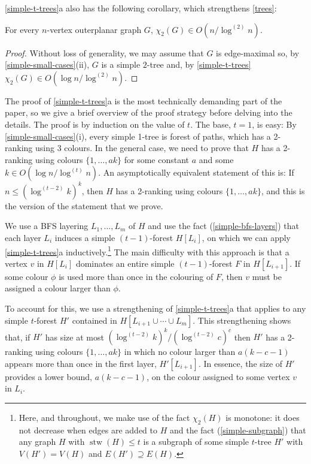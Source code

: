\documentclass[kpfonts]{patmorin}
\DeclareMathOperator{\stw}{stw}
\newcommand{\trn}{\chi_2}
\theoremstyle{named}
\newcommand{\weirdref}[2]{\cref{#1}#2}
\begin{document}
\weirdref{simple-t-trees}{a} also has the following corollary, which strengthens \cref{trees}:

\begin{cor}\label{outerplanar}
    For every $n$-vertex outerplanar graph $G$, $\trn(G)\in O(n/\log^{(2)} n)$.
\end{cor}

\begin{proof}
    Without loss of generality, we may assume that $G$ is edge-maximal so, by \cref{simple-small-cases}{(ii)}, $G$ is a simple $2$-tree and, by \cref{simple-t-trees} $\trn(G)\in O(\log n/\log^{(2)} n)$.
\end{proof}


The proof of \weirdref{simple-t-trees}{a} is the most technically demanding part of the paper, so we give a brief overview of the proof strategy before delving into the details.  The proof is by induction on the value of $t$.  The base, $t=1$, is easy: By \cref{simple-small-cases}(i), every simple 1-tree is forest of paths, which has a 2-ranking using 3 colours.  In the general case, we need to prove that $H$ has a 2-ranking using colours $\{1,\ldots,ak\}$ for some constant $a$ and some $k\in O(\log n/\log^{(t)} n)$.  An asymptotically equivalent statement of this is: If $n \le (\log^{(t-2)}k)^k$, then $H$ has a 2-ranking using colours $\{1,\ldots,ak\}$, and this is the version of the statement that we prove.

We use a BFS layering $L_1,\ldots,L_m$ of $H$ and use the fact (\cref{simple-bfs-layers}) that each layer $L_i$ induces a simple $(t-1)$-forest $H[L_i]$, on which we can apply \weirdref{simple-t-trees}{a} inductively.\footnote{Here, and throughout, we make use of the fact $\trn(H)$ is monotone: it does not decrease when edges are added to $H$ and the fact (\cref{simple-subgraph}) that any graph $H$ with $\stw(H)\le t$ is a subgraph of some simple $t$-tree $H'$ with $V(H')=V(H)$ and $E(H')\supseteq E(H)$.}  The main difficulty with this approach is that a vertex $v$ in $H[L_i]$ dominates an entire simple $(t-1)$-forest $F$ in $H[L_{i+1}]$.  If some colour $\phi$ is used more than once in the colouring of $F$, then $v$ must be assigned a colour larger than $\phi$.

To account for this, we use a strengthening of \weirdref{simple-t-trees}{a} that applies to any simple $t$-forest $H'$ contained in $H[L_{i+1}\cup\cdots\cup L_m]$.  This strengthening shows that, if $H'$ has size at most $(\log^{(t-2)} k)^k/(\log^{(t-2)} c)^c$ then $H'$ has a 2-ranking using colours $\{1,\ldots,ak\}$ in which no colour larger than $a(k-c-1)$ appears more than once in the first layer, $H'[L_{i+1}]$.  In essence, the size of $H'$ provides a lower bound, $a(k-c-1)$, on the colour assigned to some vertex $v$ in $L_i$.
\end{document}
